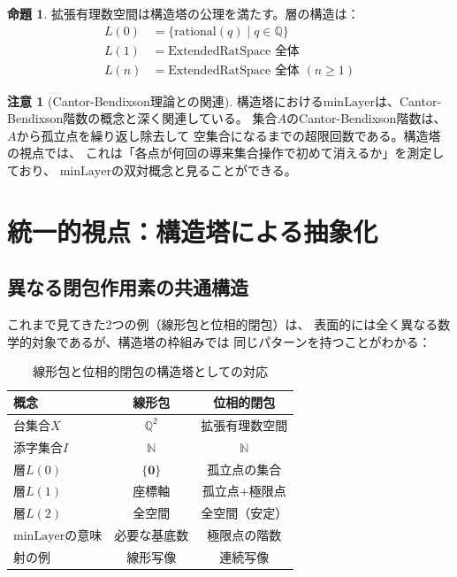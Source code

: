 \documentclass[a4paper,12pt]{ltjsarticle}
\theoremstyle{definition}
\newtheorem{proposition}[definition]{命題}
\newtheorem{remark}[definition]{注意}
\begin{document}
\begin{proposition}
拡張有理数空間は構造塔の公理を満たす。層の構造は：
\begin{align*}
L(0) &= \{\mathrm{rational}(q) \mid q \in \mathbb{Q}\} \\
L(1) &= \mathrm{ExtendedRatSpace} \text{ 全体} \\
L(n) &= \mathrm{ExtendedRatSpace} \text{ 全体 } (n \geq 1)
\end{align*}
\end{proposition}

\begin{remark}[Cantor-Bendixson理論との関連]
構造塔における$\mathrm{minLayer}$は、Cantor-Bendixson階数の概念と深く関連している。
集合$A$のCantor-Bendixson階数は、$A$から孤立点を繰り返し除去して
空集合になるまでの超限回数である。構造塔の視点では、
これは「各点が何回の導来集合操作で初めて消えるか」を測定しており、
$\mathrm{minLayer}$の双対概念と見ることができる。
\end{remark}

\section{統一的視点：構造塔による抽象化}

\subsection{異なる閉包作用素の共通構造}

これまで見てきた2つの例（線形包と位相的閉包）は、
表面的には全く異なる数学的対象であるが、構造塔の枠組みでは
同じパターンを持つことがわかる：

\begin{table}[htbp]
\centering
\begin{tabular}{|l|c|c|}
\hline
\textbf{概念} & \textbf{線形包} & \textbf{位相的閉包} \\
\hline
台集合$X$ & $\mathbb{Q}^2$ & 拡張有理数空間 \\
添字集合$I$ & $\mathbb{N}$ & $\mathbb{N}$ \\
層$L(0)$ & $\{\mathbf{0}\}$ & 孤立点の集合 \\
層$L(1)$ & 座標軸 & 孤立点$+$極限点 \\
層$L(2)$ & 全空間 & 全空間（安定） \\
$\mathrm{minLayer}$の意味 & 必要な基底数 & 極限点の階数 \\
射の例 & 線形写像 & 連続写像 \\
\hline
\end{tabular}
\caption{線形包と位相的閉包の構造塔としての対応}
\label{tab:comparison}
\end{table}
\end{document}
